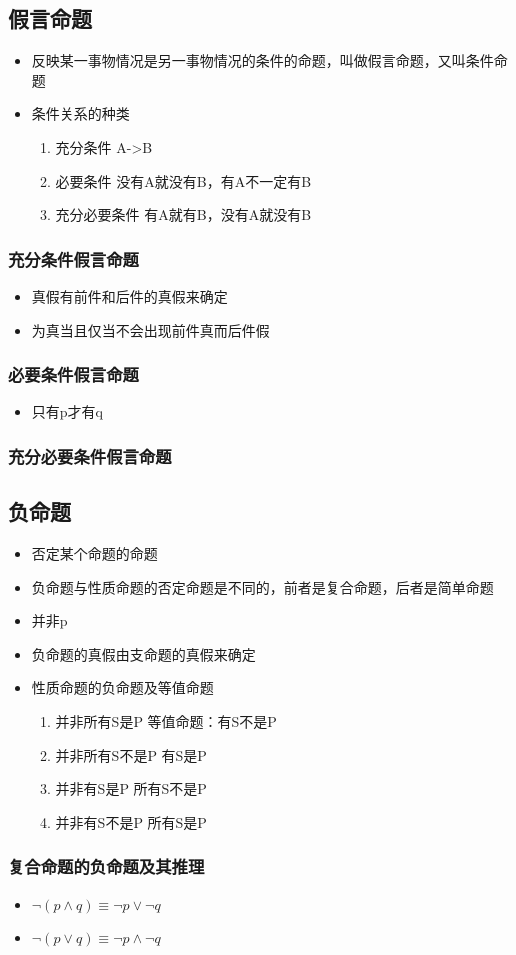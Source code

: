 \documentclass[11pt]{article}
\begin{document}
\subsection{假言命题}
\label{sec-5-5}
\begin{itemize}
\item 反映某一事物情况是另一事物情况的条件的命题，叫做假言命题，又叫条件命题
\item 条件关系的种类
\begin{enumerate}
\item 充分条件
A->B
\item 必要条件
没有A就没有B，有A不一定有B
\item 充分必要条件
有A就有B，没有A就没有B
\end{enumerate}
\end{itemize}
\subsubsection{充分条件假言命题}
\label{sec-5-5-1}
\begin{itemize}
\item 真假有前件和后件的真假来确定
\item 为真当且仅当不会出现前件真而后件假
\end{itemize}
\subsubsection{必要条件假言命题}
\label{sec-5-5-2}
\begin{itemize}
\item 只有p才有q
\end{itemize}
\subsubsection{充分必要条件假言命题}
\label{sec-5-5-3}
\subsection{负命题}
\label{sec-5-6}
\begin{itemize}
\item 否定某个命题的命题
\item 负命题与性质命题的否定命题是不同的，前者是复合命题，后者是简单命题
\item 并非p
\item 负命题的真假由支命题的真假来确定
\item 性质命题的负命题及等值命题
\begin{enumerate}
\item 并非所有S是P
等值命题：有S不是P
\item 并非所有S不是P
有S是P
\item 并非有S是P
所有S不是P
\item 并非有S不是P
所有S是P
\end{enumerate}
\end{itemize}
\subsubsection{复合命题的负命题及其推理}
\label{sec-5-6-1}
\begin{itemize}
\item $\neg(p\wedge q)\equiv \neg p\lor \neg q$
\item $\neg(p\lor q)\equiv \neg p\wedge \neg q$
\end{itemize}
\end{document}
